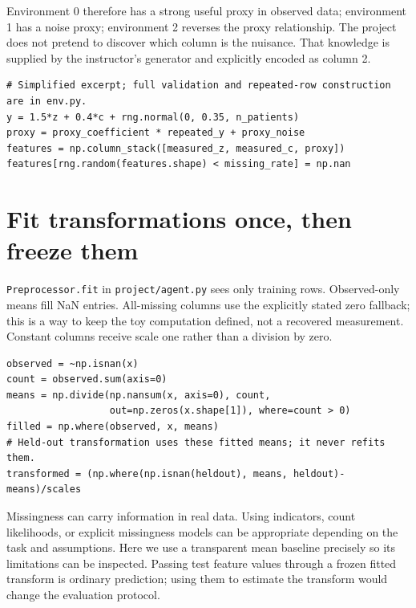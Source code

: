 \documentclass[11pt,oneside]{scrbook}
\begin{document}
Environment 0 therefore has a strong useful proxy in observed data; environment 1
has a noise proxy; environment 2 reverses the proxy relationship. The project does
not pretend to discover which column is the nuisance. That knowledge is supplied
by the instructor's generator and explicitly encoded as column 2.

\begin{verbatim}
# Simplified excerpt; full validation and repeated-row construction are in env.py.
y = 1.5*z + 0.4*c + rng.normal(0, 0.35, n_patients)
proxy = proxy_coefficient * repeated_y + proxy_noise
features = np.column_stack([measured_z, measured_c, proxy])
features[rng.random(features.shape) < missing_rate] = np.nan
\end{verbatim}

\section{Fit transformations once, then freeze them}
\texttt{Preprocessor.fit} in \texttt{project/agent.py} sees only training rows.
Observed-only means fill NaN entries. All-missing columns use the explicitly stated
zero fallback; this is a way to keep the toy computation defined, not a recovered
measurement. Constant columns receive scale one rather than a division by zero.

\begin{verbatim}
observed = ~np.isnan(x)
count = observed.sum(axis=0)
means = np.divide(np.nansum(x, axis=0), count,
                  out=np.zeros(x.shape[1]), where=count > 0)
filled = np.where(observed, x, means)
# Held-out transformation uses these fitted means; it never refits them.
transformed = (np.where(np.isnan(heldout), means, heldout)-means)/scales
\end{verbatim}

Missingness can carry information in real data. Using indicators, count likelihoods,
or explicit missingness models can be appropriate depending on the task and assumptions.
Here we use a transparent mean baseline precisely so its limitations can be inspected.
Passing test feature values through a frozen fitted transform is ordinary prediction;
using them to estimate the transform would change the evaluation protocol.
\end{document}
